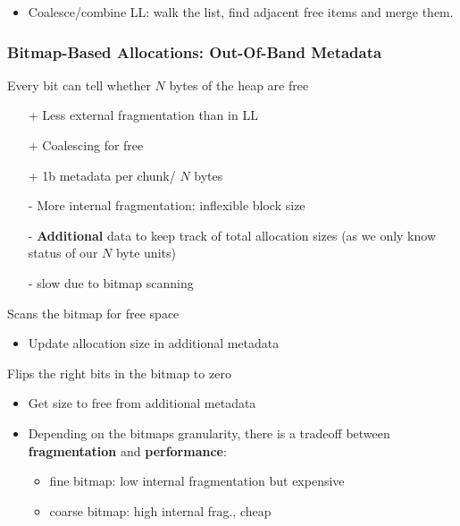 \newpar{}

\begin{itemize}
    \item Coalesce/combine LL: walk the list, find adjacent free items and merge them.
\end{itemize}

\subsubsection[Bitmap-Based Allocations]{Bitmap-Based Allocations: Out-Of-Band Metadata}
Every bit can tell whether $N$ bytes of the heap are free
\begin{itemize}
    \item [+] Less external fragmentation than in LL
    \item [+] Coalescing for free
    \item [+] 1b metadata per chunk/ $N$ bytes
    \item [-] More internal fragmentation: inflexible block size
    \item [-] \textbf{Additional} data to keep track of total allocation sizes (as we only know status of our $N$ byte units)
    \item [-] slow  due to bitmap scanning
\end{itemize}

\newpar{}

Scans the bitmap for free space %
\begin{itemize}
    \item Update allocation size in additional metadata
\end{itemize}

\newpar{}

Flips the right bits in the bitmap to zero %
\begin{itemize}
    \item Get size to free from additional metadata
\end{itemize}

\newpar{}

\begin{itemize}
    \item Depending on the bitmaps granularity, there is a tradeoff between \textbf{fragmentation} and \textbf{performance}:%
          \begin{itemize}
              \item fine bitmap: low internal fragmentation but expensive  %
              \item coarse bitmap: high internal frag., cheap  %
          \end{itemize}
\end{itemize}


